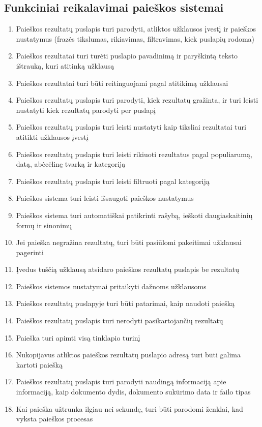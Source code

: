 \documentclass{VUMIFPSbakalaurinis}
\begin{document}
\subsection{Funkciniai reikalavimai paieškos sistemai}
\begin{enumerate}
	\item Paieškos rezultatų puslapis turi parodyti, atliktos užklausos įvestį ir paieškos nustatymus (frazės tikslumas, rikiavimas, filtravimas, kiek puslapių rodoma)
	\item Paieškos rezultatai turi turėti puslapio pavadinimą ir paryškintą teksto ištrauką, kuri atitinką užklausą
	\item Paieškos rezultatai turi būti reitinguojami pagal atitikimą užklausai
	\item Paieškos rezultatų puslapis turi parodyti, kiek rezultatų gražinta, ir turi leisti nustatyti kiek rezultatų parodyti per puslapį
	\item Paieškos rezultatų puslapis turi leisti nustatyti kaip tiksliai rezultatai turi atitikti užklausos įvestį
	\item Paieškos rezultatų puslapis turi leisti rikiuoti rezultatus pagal populiarumą, datą, abėcėlinę tvarką ir kategoriją
	\item Paieškos rezultatų puslapis turi leisti filtruoti pagal kategoriją
	\item Paieškos sistema turi leisti išsaugoti paieškos nustatymus
	\item Paieškos sistema turi automatiškai patikrinti rašybą, ieškoti daugiaskaitinių formų ir sinonimų
	\item Jei paieška negražina rezultatų, turi būti pasiūlomi pakeitimai užklausai pagerinti
	\item Įvedus tuščią užklausą atsidaro paieškos rezultatų puslapis be rezultatų
	\item Paieškos sistemos nustatymai pritaikyti dažnoms užklausoms
	\item Paieškos rezultatų puslapyje turi būti patarimai, kaip naudoti paiešką
	\item Paieškos rezultatų puslapis turi nerodyti pasikartojančių rezultatų
	\item Paieška turi apimti visą tinklapio turinį
	\item Nukopijavus atliktos paieškos rezultatų puslapio adresą turi būti galima kartoti paiešką
	\item Paieškos rezultatų puslapis turi parodyti naudingą informaciją apie informaciją, kaip dokumento dydis, dokumento sukūrimo data ir failo tipas
	\item Kai paieška užtrunka ilgiau nei sekundę, turi būti parodomi ženklai, kad vyksta paieškos procesas
\end{enumerate}
\end{document}

